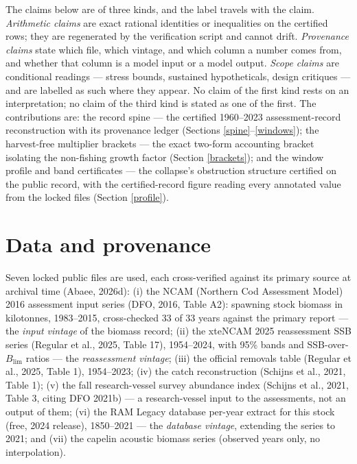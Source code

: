 \documentclass[10pt,twocolumn]{article}
\theoremstyle{plain}
\theoremstyle{remark}
\begin{document}
The claims below are of three kinds, and the label travels with the
claim. \emph{Arithmetic claims} are exact rational identities or
inequalities on the certified rows; they are regenerated by the
verification script and cannot drift. \emph{Provenance claims} state
which file, which vintage, and which column a number comes from, and
whether that column is a model input or a model output. \emph{Scope
claims} are conditional readings --- stress bounds, sustained
hypotheticals, design critiques --- and are labelled as such where
they appear. No claim of the first kind rests on an interpretation; no
claim of the third kind is stated as one of the first. The
contributions are: the record spine --- the certified 1960--2023
assessment-record reconstruction with its provenance ledger (Sections
\ref{spine}--\ref{windows}); the harvest-free multiplier brackets ---
the exact two-form accounting bracket isolating the non-fishing growth
factor (Section \ref{brackets}); and the window profile and band
certificates --- the collapse's obstruction structure certified on the
public record, with the certified-record figure reading every annotated
value from the locked files (Section \ref{profile}).

\section{Data and provenance}\label{data}

Seven locked public files are used, each cross-verified against its
primary source at archival time (Abaee, 2026d): (i) the NCAM (Northern Cod Assessment Model) 2016
assessment input series (DFO, 2016, Table A2): spawning stock biomass
in kilotonnes, 1983--2015, cross-checked 33 of 33 years against the
primary report --- the \emph{input vintage} of the biomass record;
(ii) the xteNCAM 2025 reassessment SSB series (Regular et al., 2025,
Table 17), 1954--2024, with 95\% bands and SSB-over-\(B_{\mathrm{lim}}\)
ratios --- the \emph{reassessment vintage}; (iii) the official
removals table (Regular et al., 2025, Table 1), 1954--2023; (iv) the
catch reconstruction (Schijns et al., 2021, Table 1); (v) the fall
research-vessel survey abundance index (Schijns et al., 2021, Table 3,
citing DFO 2021b) --- a research-vessel input to the assessments, not
an output of them; (vi) the RAM Legacy database per-year extract for
this stock (free, 2024 release), 1850--2021 --- the \emph{database
vintage}, extending the series to 2021; and (vii) the capelin acoustic
biomass series (observed years only, no interpolation).
\end{document}
